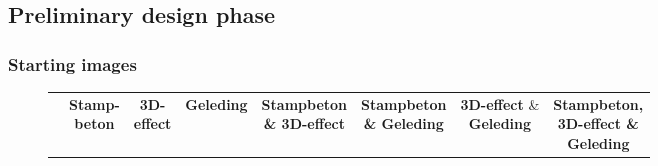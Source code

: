 \subsection{Preliminary design phase}
\subsubsection{Starting images}
\begin{figure}[H]
  \centering
  {\footnotesize
  \renewcommand{\arraystretch}{1.1}
  \setlength{\tabcolsep}{4pt}
  \begin{tabular}{c c c c c c c c}
    & \shortstack{\textbf{Stamp-}\\\textbf{beton}} 
    & \shortstack{\textbf{3D-}\\\textbf{effect}} 
    & \textbf{Geleding} 
    & \shortstack{\textbf{Stampbeton}\\ \textbf{\& 3D-effect}} 
    & \shortstack{\textbf{Stampbeton}\\ \textbf{\& Geleding}} 
    & \shortstack{\textbf{3D-effect} \&\\ \textbf{Geleding}} 
    & \shortstack{\textbf{Stampbeton,}\\\textbf{3D-effect \&}\\\textbf{Geleding}} \\


\end{tabular}}
\end{figure}

